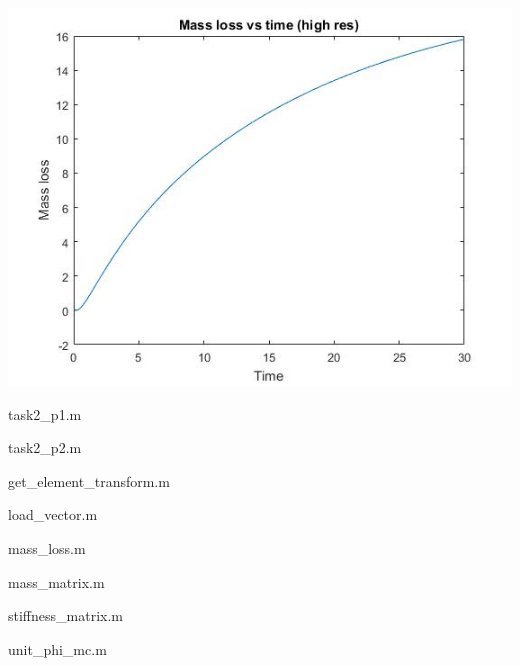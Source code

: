 \documentclass[12pt]{article}
\begin{document}
	\includegraphics[width=\textwidth]{p2_2_mlhigh}
	
	\newpage
	\large{task2\_p1.m}
	\normalsize
		
	
	\newpage
	\large{task2\_p2.m}
	\normalsize
		
	
	\newpage
	\large{get\_element\_transform.m}
	\normalsize	
		
	
	\newpage
	\large{load\_vector.m}
	\normalsize	
		
	
	\newpage
	\large{mass\_loss.m}
	\normalsize	
	
	
	\newpage
	\large{mass\_matrix.m}
	\normalsize	
	
	
	\newpage
	\large{stiffness\_matrix.m}
	\normalsize	
	
	
	\newpage
	\large{unit\_phi\_mc.m}
	\normalsize	
	
	
	
\end{document}
